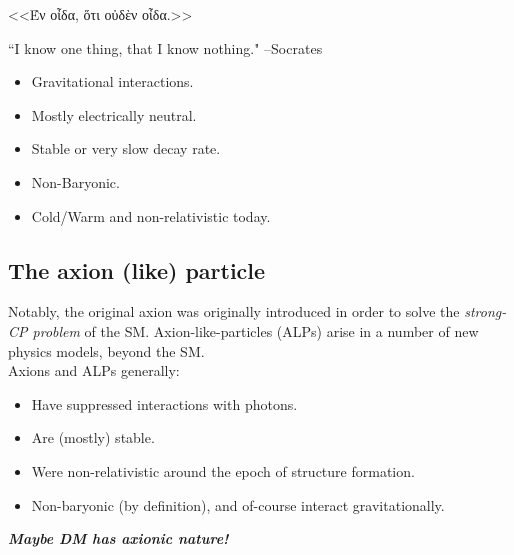 \documentclass[10pt,utf8,compress,xcolor=dvipsnames]{beamer}
\begin{document}
\begin{frame}{\insertsubsectionhead}
	\begin{center}
		\begin{otherlanguage}{greek}
			<<Έν οἶδα, ὅτι οὐδὲν οἶδα.>>\\
		\end{otherlanguage}		
	``I know one thing,  that I know nothing."
	\flushright --Socrates \pause
	\end{center}

	\begin{itemize}
		\item Gravitational interactions.
		\item Mostly electrically neutral.
		\item Stable or very slow decay rate. 
		\item Non-Baryonic.
		\item Cold/Warm and non-relativistic today.
	\end{itemize}
	
\end{frame}

\subsection{The axion (like) particle}
\begin{frame}{\insertsubsectionhead}
%
Notably, the original axion was originally introduced in order to solve the {\em strong-CP problem} of the SM.
Axion-like-particles (ALPs) arise in a number of new physics models, beyond the SM.  \\[0.5cm]

Axions and ALPs generally:
%
	\begin{itemize}
	\item Have suppressed interactions with photons.
	\item Are (mostly) stable. 
	\item Were non-relativistic around the epoch of structure formation. 
	\item Non-baryonic (by definition), and of-course interact gravitationally.\pause\\[1cm]
\end{itemize}

\pause
\begin{center}
	{\bf \em Maybe DM has axionic nature!}	
\end{center}

\end{frame}
\end{document}
